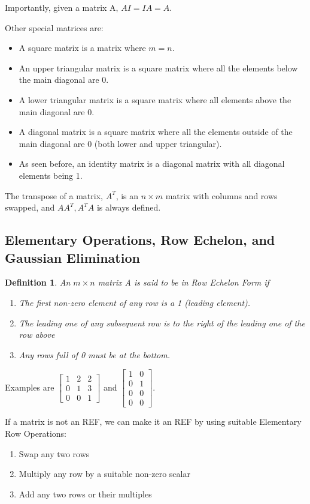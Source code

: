 \documentclass{article}
\newtheorem{definition}{Definition}
\begin{document}
Importantly, given a matrix A, $AI=IA=A$.

Other special matrices are:
\begin{itemize}
	\item A square matrix is a matrix where $m=n$.
	\item An upper triangular matrix is a square matrix where all the elements below the main diagonal are 0.
	\item A lower triangular matrix is a square matrix where all elements above the main diagonal are 0.
	\item A diagonal matrix is a square matrix where all the elements outside of the main diagonal are 0 (both lower and upper triangular).
	\item As seen before, an identity matrix is a diagonal matrix with all diagonal elements being 1.
\end{itemize}

The transpose of a matrix, $A^T$, is an $n\times m$ matrix with columns and rows swapped, and $A A^T, A^T A$ is always defined.

\subsection{Elementary Operations, Row Echelon, and Gaussian Elimination}

\begin{definition}
An $m\times n$ matrix A is said to be in Row Echelon Form if
\begin{enumerate}
	\item The first non-zero element of any row is a 1 (leading element).
	\item The leading one of any subsequent row is to the right of the 
		leading one of the row above
	\item Any rows full of 0 must be at the bottom.
\end{enumerate}
\end{definition}
Examples are $\begin{bmatrix}1&2&2\\0&1&3\\0&0&1\end{bmatrix}$ and 
$\begin{bmatrix}1&0\\0&1\\0&0\\0&0\end{bmatrix}$.

If a matrix is not an REF, we can make it an REF by using suitable Elementary Row Operations:
\begin{enumerate}
	\item Swap any two rows
	\item Multiply any row by a suitable non-zero scalar
	\item Add any two rows or their multiples
\end{enumerate}
\end{document}
